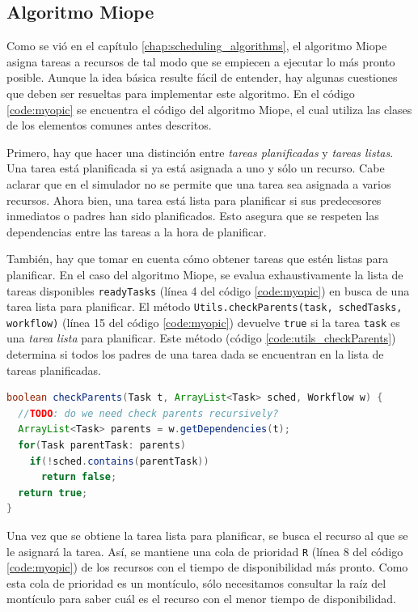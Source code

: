\subsection{Algoritmo Miope}
Como se vió en el capítulo \ref{chap:scheduling_algorithms}, el algoritmo Miope asigna tareas a recursos de tal modo que se empiecen a ejecutar lo más pronto posible. Aunque la idea básica resulte fácil de entender, hay algunas cuestiones que deben ser resueltas para implementar este algoritmo. En el código \ref{code:myopic} se encuentra el código del algoritmo Miope, el cual utiliza las clases de los elementos comunes antes descritos. 

Primero, hay que hacer una distinción entre \emph{tareas planificadas} y \emph{tareas listas}. Una tarea está planificada si ya está asignada a uno y sólo un recurso. Cabe aclarar que en el simulador no se permite que una tarea sea asignada a varios recursos. Ahora bien, una tarea está lista para planificar si sus predecesores inmediatos o padres han sido planificados. Esto asegura que se respeten las dependencias entre las tareas a la hora de planificar.

También, hay que tomar en cuenta cómo obtener tareas que estén listas para planificar. En el caso del algoritmo Miope, se evalua exhaustivamente la lista de tareas disponibles \texttt{readyTasks} (línea 4 del código \ref{code:myopic}) en busca de una tarea lista para planificar. El método \texttt{Utils.checkParents(task, schedTasks, workflow)} (línea 15 del código \ref{code:myopic}) devuelve \texttt{true} si la tarea \texttt{task} es una \emph{tarea lista} para planificar. Este método (código \ref{code:utils_checkParents}) determina si todos los padres de una tarea dada se encuentran en la lista de tareas planificadas.

\begin{lstlisting}[language=java,label={code:utils_checkParents},caption={Método que verifica si los padres de una tarea están planificados.},float]
boolean checkParents(Task t, ArrayList<Task> sched, Workflow w) {
  //TODO: do we need check parents recursively?
  ArrayList<Task> parents = w.getDependencies(t);
  for(Task parentTask: parents)
    if(!sched.contains(parentTask))
      return false;
  return true;
}
\end{lstlisting}

Una vez que se obtiene la tarea lista para planificar, se busca el recurso al que se le asignará la tarea. Así, se mantiene una cola de prioridad \texttt{R} (línea 8 del código \ref{code:myopic}) de los recursos con el tiempo de disponibilidad más pronto. Como esta cola de prioridad es un montículo, sólo necesitamos consultar la raíz del montículo para saber cuál es el recurso con el menor tiempo de disponibilidad. 

